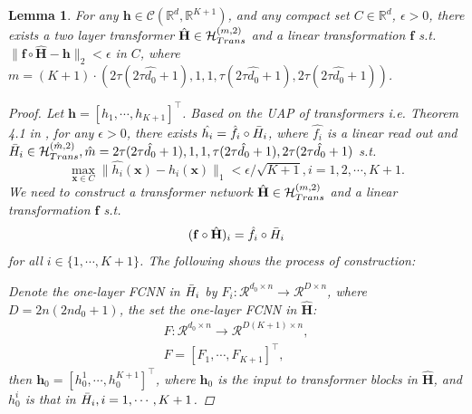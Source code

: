 \documentclass{article}
\theoremstyle{plain}
\newtheorem{lemma}[theorem]{Lemma}
\theoremstyle{definition}
\theoremstyle{remark}
\begin{document}
\begin{lemma}
    For any $\mathbf{h} \in \mathcal{C}(\mathbb{R}^d, \mathbb{R}^{K+1})$, and any compact set $C \in \mathbb{R}^d$, $\epsilon >0$, there exists a two layer transformer $\hat{\mathbf{H}} \in \mathcal{H}_{\rm Trans}^{(m,2)}$ and a linear transformation $\mathbf{f}$ \textit{s}.\textit{t}. $\|\mathbf{f}\circ \hat{\mathbf{H}}-\mathbf{h}\|_2<\epsilon $ in $C$, where $m=(K+1)\cdot\left(2\tau(2\tau \hat{d_0}+1),1,1,\tau(2\tau \hat{d_0}+1),2\tau(2\tau \hat{d_0}+1)\right)$.
    \begin{proof}
        Let $\mathbf{h} = [h_1,\cdots,h_{K+1}]^{\top}$. Based on the UAP of transformers \textit{i}.\textit{e}. Theorem 4.1 in \citet{jiang2023approximation}, for any $\epsilon>0$, there exists $\hat{h_i} = \hat{f_i}\circ \Bar{H}_i $, where $\hat{f_i}$ is a linear read out and $\Bar{H}_i \in \mathcal{H}_{\rm Trans}^{(\hat{m},2)},\hat{m}=2\tau(2\tau \hat{d_0}+1),1,1,\tau(2\tau \hat{d_0}+1),2\tau(2\tau \hat{d_0}+1)$ \textit{s}.\textit{t}.
        \begin{equation}
            \max_{\mathbf{x}\in C}\|\hat{h_i}(\mathbf{x})-h_i(\mathbf{x})\|_1<\epsilon/\sqrt{K+1}, i=1,2,\cdots, K+1.
            \label{Eq: uap}
        \end{equation}
        We need to construct a transformer network $\hat{\mathbf{H}} \in \mathcal{H}_{\rm Trans}^{(m,2)}$ and a linear transformation $\mathbf{f}$ \textit{s}.\textit{t}. \begin{equation}
            (\mathbf{f}\circ \hat{\mathbf{H}})_i = \hat{f}_i\circ \Bar{H}_i
            \label{construct condition}
        \end{equation}
        for all $i \in \{1,\cdots,K+1\}$. The following shows the process of construction:
        
        Denote the one-layer FCNN in $\Bar{H}_i$ by $F_i: \mathcal{R}^{d_0\times n}\xrightarrow{} \mathcal{R}^{D\times n}$, where $D = 2n(2nd_0+1)$, the set the one-layer FCNN in $\hat{\mathbf{H}}$:
        \begin{equation}
            \begin{aligned}
                F: \mathcal{R}^{d_0\times n}\xrightarrow{} \mathcal{R}^{D(K+1)\times n},\\
                F = [F_1, \cdots, F_{K+1}]^{\top},
            \end{aligned}
        \end{equation}
        then $\mathbf{h}_0 = [h_0^1, \cdots, h_0^{K+1}]^{\top}$, where $\mathbf{h}_0$ is the input to transformer blocks in $\hat{\mathbf{H}}$, and $h_0^i$ is that in $\Bar{H}_i, i = 1, \cdots, K+1$.


\end{proof}
\end{lemma}
\end{document}

